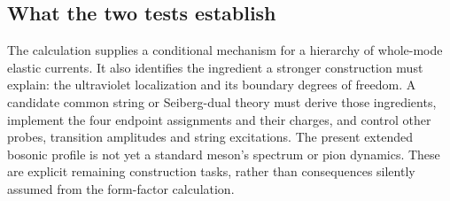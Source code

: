 \subsection{What the two tests establish}
The calculation supplies a conditional mechanism for a hierarchy of whole-mode elastic currents. It also identifies the ingredient a stronger construction must explain: the ultraviolet localization and its boundary degrees of freedom. A candidate common string or Seiberg-dual theory must derive those ingredients, implement the four endpoint assignments and their charges, and control other probes, transition amplitudes and string excitations. The present extended bosonic profile is not yet a standard meson's spectrum or pion dynamics. These are explicit remaining construction tasks, rather than consequences silently assumed from the form-factor calculation.
